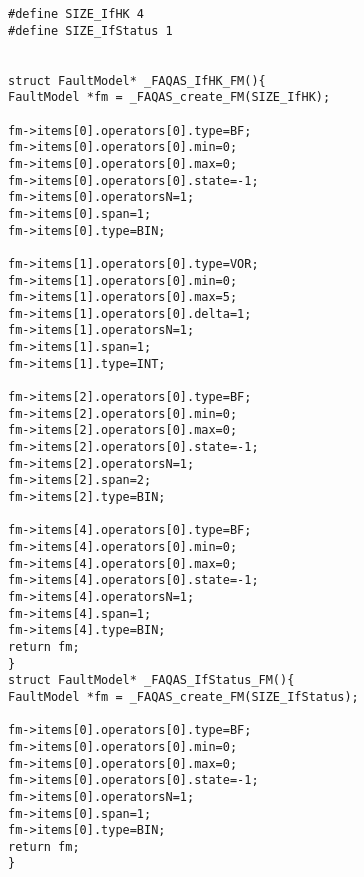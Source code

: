 
\begin{minipage}{15cm}
\begin{lstlisting}[style=CStyle, caption=Example of generated fault models in C., label=faultModelExample, mathescape=true]
#define SIZE_IfHK 4
#define SIZE_IfStatus 1


struct FaultModel* _FAQAS_IfHK_FM(){
FaultModel *fm = _FAQAS_create_FM(SIZE_IfHK);

fm->items[0].operators[0].type=BF;
fm->items[0].operators[0].min=0;
fm->items[0].operators[0].max=0;
fm->items[0].operators[0].state=-1;
fm->items[0].operatorsN=1;
fm->items[0].span=1;
fm->items[0].type=BIN;

fm->items[1].operators[0].type=VOR;
fm->items[1].operators[0].min=0;
fm->items[1].operators[0].max=5;
fm->items[1].operators[0].delta=1;
fm->items[1].operatorsN=1;
fm->items[1].span=1;
fm->items[1].type=INT;

fm->items[2].operators[0].type=BF;
fm->items[2].operators[0].min=0;
fm->items[2].operators[0].max=0;
fm->items[2].operators[0].state=-1;
fm->items[2].operatorsN=1;
fm->items[2].span=2;
fm->items[2].type=BIN;

fm->items[4].operators[0].type=BF;
fm->items[4].operators[0].min=0;
fm->items[4].operators[0].max=0;
fm->items[4].operators[0].state=-1;
fm->items[4].operatorsN=1;
fm->items[4].span=1;
fm->items[4].type=BIN;
return fm;
}
struct FaultModel* _FAQAS_IfStatus_FM(){
FaultModel *fm = _FAQAS_create_FM(SIZE_IfStatus);

fm->items[0].operators[0].type=BF;
fm->items[0].operators[0].min=0;
fm->items[0].operators[0].max=0;
fm->items[0].operators[0].state=-1;
fm->items[0].operatorsN=1;
fm->items[0].span=1;
fm->items[0].type=BIN;
return fm;
}
\end{lstlisting}
\end{minipage}

